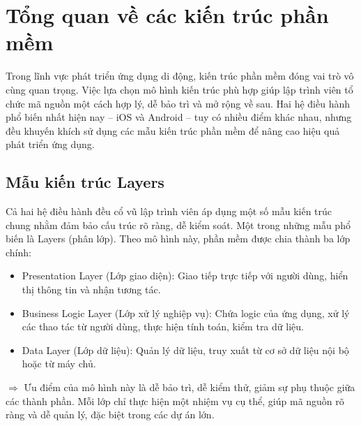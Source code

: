 \section{Tổng quan về các kiến trúc phần mềm}

\begin{flushleft}
  \hspace*{0.8cm}Trong lĩnh vực phát triển ứng dụng di động, kiến trúc phần mềm đóng vai trò vô cùng quan trọng. Việc lựa chọn mô hình kiến trúc phù hợp giúp lập trình viên tổ chức mã nguồn một cách hợp lý, dễ bảo trì và mở rộng về sau. Hai hệ điều hành phổ biến nhất hiện nay – iOS và Android – tuy có nhiều điểm khác nhau, nhưng đều khuyến khích sử dụng các mẫu kiến trúc phần mềm để nâng cao hiệu quả phát triển ứng dụng.
\end{flushleft}

\subsection{Mẫu kiến trúc Layers}
\renewcommand{\labelitemi}{--}    
    \begin{flushleft}
        \hspace*{0.8cm}Cả hai hệ điều hành đều cổ vũ lập trình viên áp dụng một số mẫu kiến trúc chung nhằm đảm bảo cấu trúc rõ ràng, dễ kiểm soát. Một trong những mẫu phổ biến là Layers (phân lớp). Theo mô hình này, phần mềm được chia thành ba lớp chính:
        \setlength{\leftmargini}{1.5cm}
        \begin{itemize}
            \item Presentation Layer (Lớp giao diện): Giao tiếp trực tiếp với người dùng, hiển thị thông tin và nhận tương tác.
            \item Business Logic Layer (Lớp xử lý nghiệp vụ): Chứa logic của ứng dụng, xử lý các thao tác từ người dùng, thực hiện tính toán, kiểm tra dữ liệu.
            \item Data Layer (Lớp dữ liệu): Quản lý dữ liệu, truy xuất từ cơ sở dữ liệu nội bộ hoặc từ máy chủ.
        \end{itemize}
    \end{flushleft}

    \begin{flushleft}
      \hspace*{0.8cm}$\Rightarrow$ Ưu điểm của mô hình này là dễ bảo trì, dễ kiểm thử, giảm sự phụ thuộc giữa các thành phần. Mỗi lớp chỉ thực hiện một nhiệm vụ cụ thể, giúp mã nguồn rõ ràng và dễ quản lý, đặc biệt trong các dự án lớn.
    \end{flushleft}

